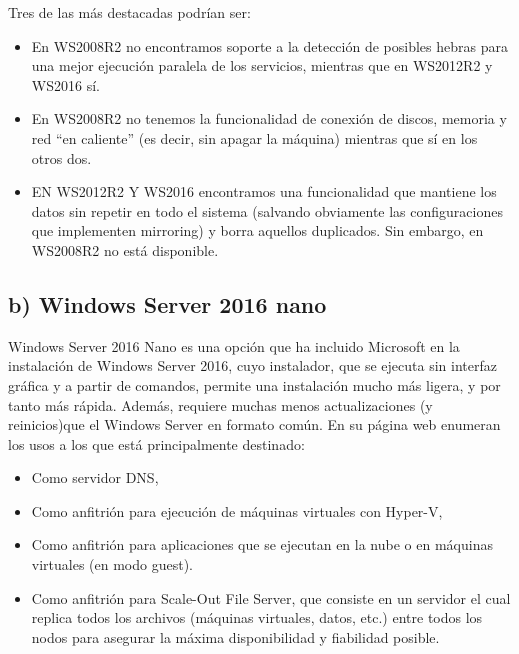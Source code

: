 Tres de las más destacadas podrían ser:
\begin{itemize}
	\item En WS2008R2 no encontramos soporte a la detección de posibles hebras para una mejor ejecución paralela de los servicios,
	mientras que en WS2012R2 y WS2016 sí.
	\item En WS2008R2 no tenemos la funcionalidad de conexión de discos, memoria y red ``en caliente'' (es decir, sin apagar la máquina)
	mientras que sí en los otros dos.
	\item EN WS2012R2 Y WS2016 encontramos una funcionalidad que mantiene los datos sin repetir en todo el sistema (salvando obviamente
	las configuraciones que implementen mirroring) y borra aquellos duplicados. Sin embargo, en WS2008R2 no está disponible.
\end{itemize}

\subsection{b) Windows Server 2016 nano}
Windows Server 2016 Nano es una opción que ha incluido Microsoft \cite{ws2016nano} en la instalación de Windows Server 2016, cuyo 
instalador, que se ejecuta sin interfaz gráfica y a partir de comandos, permite una instalación mucho más ligera, y por tanto más rápida. 
Además, requiere muchas menos actualizaciones (y reinicios)que el Windows Server en formato común. En su página web enumeran los usos a 
los que está principalmente destinado: 
\begin{itemize}
	\item Como servidor DNS,
	\item Como anfitrión para ejecución de máquinas virtuales con Hyper-V,
	\item Como anfitrión para aplicaciones que se ejecutan en la nube o en máquinas virtuales (en modo guest).
	\item Como anfitrión para Scale-Out File Server, que consiste en un servidor el cual replica todos los archivos (máquinas virtuales,
	datos, etc.) entre todos los nodos para asegurar la máxima disponibilidad y fiabilidad posible.
\end{itemize}



